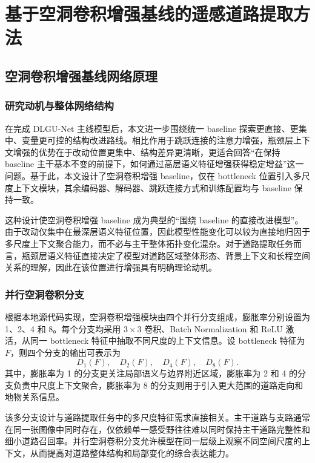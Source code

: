 
\chapter{基于空洞卷积增强基线的遥感道路提取方法}
\label{cha:v2-dilated}

\section{空洞卷积增强基线网络原理}
\subsection{研究动机与整体网络结构}
在完成 DLGU-Net 主线模型后，本文进一步围绕统一 baseline 探索更直接、更集中、变量更可控的结构改进路线。相比作用于跳跃连接的注意力增强，瓶颈层上下文增强的优势在于改动位置更集中、结构差异更清晰，更适合回答“在保持 baseline 主干基本不变的前提下，如何通过高层语义特征增强获得稳定增益”这一问题。基于此，本文设计了空洞卷积增强 baseline，仅在 bottleneck 位置引入多尺度上下文模块，其余编码器、解码器、跳跃连接方式和训练配置均与 baseline 保持一致。

这种设计使空洞卷积增强 baseline 成为典型的“围绕 baseline 的直接改进模型”。由于改动仅集中在最深层语义特征位置，因此模型性能变化可以较为直接地归因于多尺度上下文聚合能力，而不必与主干整体拓扑变化混杂。对于道路提取任务而言，瓶颈层语义特征直接决定了模型对道路区域整体形态、背景上下文和长程空间关系的理解，因此在该位置进行增强具有明确理论动机。

\subsection{并行空洞卷积分支}
根据本地源代码实现，空洞卷积增强模块由四个并行分支组成，膨胀率分别设置为 1、2、4 和 8。每个分支均采用 $3 \times 3$ 卷积、Batch Normalization 和 ReLU 激活，从同一 bottleneck 特征中抽取不同尺度的上下文信息。设 bottleneck 特征为 $F$，则四个分支的输出可表示为
\[
D_1(F),\quad D_2(F),\quad D_4(F),\quad D_8(F).
\]
其中，膨胀率为 1 的分支更关注局部语义与边界附近区域，膨胀率为 2 和 4 的分支负责中尺度上下文聚合，膨胀率为 8 的分支则用于引入更大范围的道路走向和地物关系信息。

该多分支设计与道路提取任务中的多尺度特征需求直接相关。主干道路与支路通常在同一张图像中同时存在，仅依赖单一感受野往往难以同时保持主干道路完整性和细小道路召回率。并行空洞卷积分支允许模型在同一层级上观察不同空间尺度的上下文，从而提高对道路整体结构和局部变化的综合表达能力。

